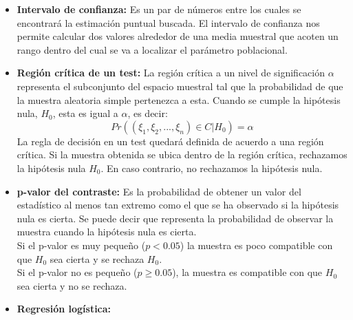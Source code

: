 \documentclass[12pt,a4paper]{article}
\begin{document}
\begin{itemize}
    \item \textbf{Intervalo de confianza:} Es un par de números entre los cuales se encontrará la estimación puntual buscada. El intervalo de confianza nos permite calcular dos valores alrededor de una media muestral que acoten un rango dentro del cual se va a localizar el parámetro poblacional.
    
    \item \textbf{Región crítica de un test:} La región crítica a un nivel de significación $\alpha$ representa el subconjunto del espacio muestral tal que la probabilidad de que la muestra aleatoria simple pertenezca a esta. Cuando se cumple la hipótesis nula, $H_0$, esta es igual a $\alpha$, es decir:
    \begin{equation}
        Pr((\xi_1, \xi_2, ..., \xi_n)\in C|H_0) = \alpha
    \end{equation}
    La regla de decisión en un test quedará definida de acuerdo a una región crítica. Si la muestra obtenida se ubica dentro de la región crítica, rechazamos la hipótesis nula $H_0$. En caso contrario, no rechazamos la hipótesis nula.
    
    \item \textbf{p-valor del contraste:} Es la probabilidad de obtener un valor del estadístico al menos tan extremo como el que se ha observado si la hipótesis nula es cierta. Se puede decir que representa la probabilidad de observar la muestra cuando la hipótesis nula es cierta.\\
    Si el p-valor es muy pequeño ($p < 0.05$) la muestra es poco compatible con que $H_0$ sea cierta y se rechaza $H_0$.\\
    Si el p-valor no es pequeño ($p \geq 0.05$), la muestra es compatible con que $H_0$ sea cierta y no se rechaza.
    
    \item \textbf{Regresión logística:}
    
    
\end{itemize}
\end{document}
